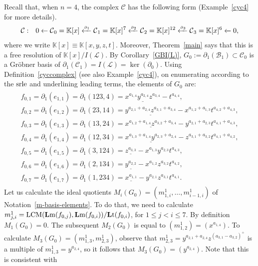 \documentclass[ALCO]{cedram}
\newcommand{\mbk}{\mbox{$\mathbb{K}$}}
\newcommand{\lm}{\mbox{${\bf L}{\rm m}$}}
\newcommand{\lt}{\mbox{${\bf L}{\rm t}$}}
\newcommand{\mcb}{\mbox{$\mathcal{B}$}}
\newcommand{\mcc}{\mbox{$\mathcal{C}$}}
\newcommand{\mcl}{\mbox{$\mathcal{L}$}}
\newcommand{\dif}{\mbox{$\partial$}}
\newcommand{\sdif}{\mbox{\tiny $\partial$}}
\newcommand{\Lcm}{\mbox{${\rm LCM}$}}
\newcommand{\srle}{\mbox{${\rm srle}$}}
\begin{document}
Recall that, when $n=4$, the complex $\mcc$ has the following form
(\cf Example~\ref{cyc4} for more details).
\begin{eqnarray*}
\mcc&:&0\leftarrow
\mcc_0=\mbk[x]\xleftarrow{\sdif_{1}}\mcc_{1}=\mbk[x]^{7}
\xleftarrow{\sdif_{2}}\mcc_{2}=\mbk[x]^{12}\xleftarrow{\sdif_{3}}
\mcc_{3}=\mbk[x]^{6}\xleftarrow{} 0,
\end{eqnarray*}
where we write $\mbk[x]\equiv \mbk[x,y,z,t]$.  Moreover,
Theorem~\ref{main} says that this is a free resolution of
$\mbk[x]/I(\mcl)$. By Corollary~\ref{GBI(L)},
$G_0:=\dif_1(\mcb_1)\subset\mcc_0$ is a Gr\"obner basis of
$\dif_1(\mcc_1)=I(\mcl)=\ker(\dif_0)$. Using
Definition~\ref{cyccomplex} (see also Example~\ref{cyc4}), on
enumerating according to the $\srle$ and underlining leading terms,
the elements of $G_0$ are:
\begin{eqnarray*}
\begin{array}{l}
f_{0,1}=\dif_1(e_{1,1})=
\dif_1(123,4)=\underline{x^{a_{1,4}}y^{a_{2,4}}z^{a_{3,4}}}-t^{a_{4,4}},\\
f_{0,2}=\dif_1(e_{1,2})=
\dif_1(23,14)=\underline{y^{a_{2,1}+a_{2,4}}z^{a_{3,1}+a_{3,4}}}-
x^{a_{1,2}+a_{1,3}}t^{a_{4,2}+a_{4,3}},\\
f_{0,3}=\dif_1(e_{1,3})=
\dif_1(13,24)=\underline{x^{a_{1,2}+a_{1,4}}z^{a_{3,2}+a_{3,4}}}-
y^{a_{2,1}+a_{2,3}}t^{a_{4,1}+a_{4,3}},\\
f_{0,4}=\dif_1(e_{1,4})=
\dif_1(12,34)=\underline{x^{a_{1,3}+a_{1,4}}y^{a_{2,3}+a_{2,4}}}-
z^{a_{3,1}+a_{3,2}}t^{a_{4,1}+a_{4,2}},\\
f_{0,5}=\dif_1(e_{1,5})=
\dif_1(3,124)=\underline{z^{a_{3,3}}}-x^{a_{1,3}}y^{a_{2,3}}t^{a_{4,3}},\\
f_{0,6}=\dif_1(e_{1,6})=
\dif_1(2,134)=\underline{y^{a_{2,2}}}-x^{a_{1,2}}z^{a_{3,2}}t^{a_{4,2}},\\
f_{0,7}=\dif_1(e_{1,7})=
\dif_1(1,234)=\underline{x^{a_{1,1}}}-y^{a_{2,1}}z^{a_{3,1}}t^{a_{4,1}}.
\end{array}
\end{eqnarray*}
Let us calculate the ideal quotients $M_i(G_0)=(m^1_{1,i},\ldots
,m^1_{i-1,i})$ of Notation~\ref{m-basis-elements}.  To do that, we
need to calculate
$m^1_{j,i}=\Lcm(\lm(f_{0,j}),\lm(f_{0,i}))/\lt(f_{0,i})$, for $1\leq
j<i\leq 7$. By definition $M_1(G_0)=0$. The subsequent $M_2(G_0)$ is
equal to $(m^1_{1,2})=(x^{a_{1,4}})$. To calculate
$M_3(G_0)=(m^1_{1,3},m^1_{2,3})$, observe that
$m^1_{2,3}=y^{a_{2,1}+a_{2,4}}z^{(a_{3,1}-a_{3,2})^+}$ is a multiple
of $m^1_{1,3}=y^{a_{2,4}}$, so it follows that
$M_3(G_0)=(y^{a_{2,4}})$. Note that this is consistent with
\end{document}
